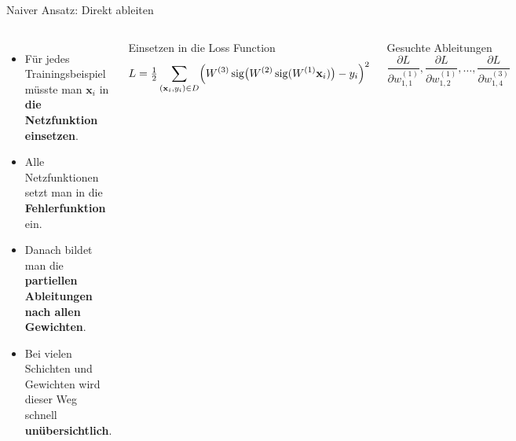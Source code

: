 \begin{frame}{Naiver Ansatz: Direkt ableiten}
\small
\begin{columns}

\begin{itemize}
    \item Für jedes Trainingsbeispiel müsste man $\mathbf{x}_i$ in \textbf{die Netzfunktion
          einsetzen}.

    \item Alle Netzfunktionen setzt man in die \textbf{Fehlerfunktion} ein.

    \item Danach bildet man die \textbf{partiellen Ableitungen
          nach allen Gewichten}.

    \item Bei vielen Schichten und Gewichten wird dieser Weg schnell
          \textbf{unübersichtlich}.
\end{itemize}

\footnotesize
\begin{blockC3}{\footnotesize Einsetzen in die Loss Function}
\[
L=\tfrac12\sum_{(\mathbf{x}_i,y_i)\in D}\Bigl(W^{(3)}\operatorname{sig}\bigl(W^{(2)}\operatorname{sig}(W^{(1)}\mathbf{x}_i)\bigr)- y_i\Bigr)^2
\]
\end{blockC3}

\vspace{0.3cm}

\begin{blockC4}{\footnotesize Gesuchte Ableitungen}
\[
    \frac{\partial L}{\partial w_{1,1}^{(1)}},
    \frac{\partial L}{\partial w_{1,2}^{(1)}},
    \dots,
    \frac{\partial L}{\partial w_{1,4}^{(3)}}
\]
\end{blockC4}

\end{columns}

\end{frame}

